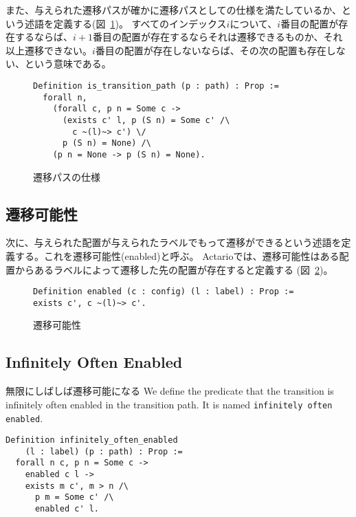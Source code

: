 また、与えられた遷移パスが確かに遷移パスとしての仕様を満たしているか、という述語を定義する(図~\ref{code:formalization:path-spec})。
すべてのインデックス$i$について、$i$番目の配置が存在するならば、$i+1$番目の配置が存在するならそれは遷移できるものか、それ以上遷移できない。$i$番目の配置が存在しないならば、その次の配置も存在しない、という意味である。

\begin{figure}[tp]
  \begin{lstlisting}
Definition is_transition_path (p : path) : Prop :=
  forall n,
    (forall c, p n = Some c ->
      (exists c' l, p (S n) = Some c' /\
        c ~(l)~> c') \/
      p (S n) = None) /\
    (p n = None -> p (S n) = None).
  \end{lstlisting}
  \label{code:formalization:path-spec}
  \caption{遷移パスの仕様}
\end{figure}

\subsection{遷移可能性}
次に、与えられた配置が与えられたラベルでもって遷移ができるという述語を定義する。これを遷移可能性(enabled)と呼ぶ。
Actarioでは、遷移可能性はある配置からあるラベルによって遷移した先の配置が存在すると定義する (図~\ref{code:formalization:enabled})。

\begin{figure}[tp]
  \begin{lstlisting}
Definition enabled (c : config) (l : label) : Prop := exists c', c ~(l)~> c'.
  \end{lstlisting}
  \label{code:formalization:enabled}
  \caption{遷移可能性}
\end{figure}

\subsection{Infinitely Often Enabled}
無限にしばしば遷移可能になる
We define the predicate that the transition is infinitely often enabled in the transition path.
It is named \texttt{infinitely often enabled}.

\begin{lstlisting}
Definition infinitely_often_enabled
    (l : label) (p : path) : Prop :=
  forall n c, p n = Some c ->
    enabled c l ->
    exists m c', m > n /\
      p m = Some c' /\
      enabled c' l.
\end{lstlisting}


